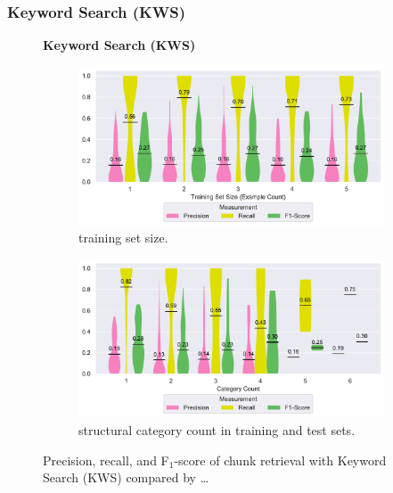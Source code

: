 \documentclass[10pt,journal,compsoc]{IEEEtran}
\begin{document}
\subsubsection{Keyword Search (KWS)}
\label{sec:r:kws}
\begin{figure}
\centering
    \textbf{Keyword Search (KWS)}\par\medskip
\begin{subfigure}[b]{\columnwidth}
		\centering
		\includegraphics[width=\columnwidth,
		clip]{img/big-study/recall-precision-examplecount-KWS.pdf}
		\caption{training set size.}
		\label{fig:recall-precision-examplecount-KWS}
\end{subfigure}\hspace{\fill}
\begin{subfigure}[b]{\columnwidth}
		\centering
		\includegraphics[width=\columnwidth,
		clip]{img/big-study/recall-precision-categorycount-KWS.pdf}
		\caption{structural category count
		in training and test sets.}
		\label{fig:recall-precision-categorycount-KWS}
\end{subfigure}
\caption{Precision, recall, and F$_{1}$-score of chunk retrieval with
Keyword Search (KWS) compared by \ldots}
\label{fig:results-KWS}
\end{figure}
\end{document}
